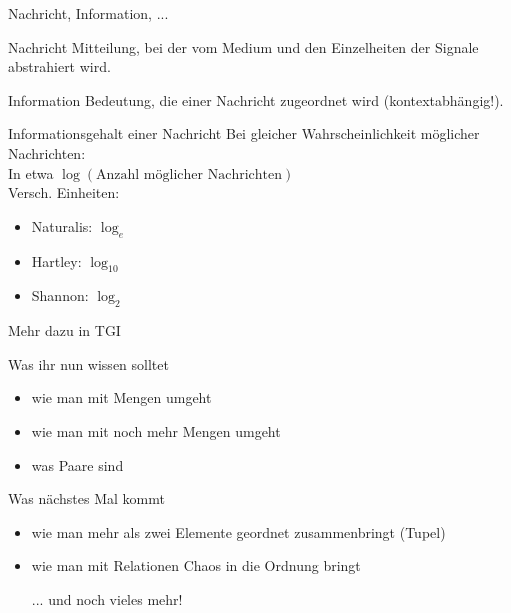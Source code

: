 \begin{frame}{Nachricht, Information, ...}
	
	\begin{block}{Nachricht}
		      Mitteilung, bei der vom Medium und den Einzelheiten der Signale abstrahiert wird.
	\end{block}
	
	\pause
	\begin{block}{Information}
		      Bedeutung, die einer Nachricht zugeordnet wird (kontextabhängig!).
	\end{block}
	
	\pause
	\begin{block}{Informationsgehalt einer Nachricht}
		Bei gleicher Wahrscheinlichkeit möglicher Nachrichten: \\ \quad In etwa \quad $\log(\text{Anzahl möglicher Nachrichten})$ \\
			Versch. Einheiten: \\ \vspace{-.2\baselineskip}
			\begin{itemize}
				\item Naturalis: $\log_e$ 
				\item Hartley: $\log_{10}$ 
				\item Shannon: $\log_2$
			\end{itemize}
		\impl Mehr dazu in TGI
	\end{block}

\end{frame}



\begin{frame}
	\begin{block}{Was ihr nun wissen solltet}
		\begin{itemize}
			\item wie man mit Mengen umgeht
			\item wie man mit noch mehr Mengen umgeht
			\item was Paare sind
		\end{itemize}
	\end{block}

	\begin{block}{Was nächstes Mal kommt}
		\begin{itemize}
			\item wie man mehr als zwei Elemente geordnet zusammenbringt (Tupel)
			\item wie man mit Relationen Chaos in die Ordnung bringt
			\item[ ...] und noch vieles mehr!
		\end{itemize}
	\end{block}
\end{frame}





